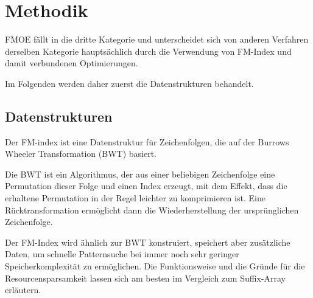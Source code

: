 \chapter{Methodik}
\label{ch:methodik}

FMOE fällt in die dritte Kategorie und unterscheidet sich von anderen Verfahren derselben Kategorie hauptsächlich durch die Verwendung von FM-Index und damit verbundenen Optimierungen.

Im Folgenden werden daher zuerst die Datenstrukturen behandelt.

\section{Datenstrukturen}
\label{sec:datenstrukturen}

Der FM-index ist eine Datenstruktur für Zeichenfolgen, die auf der Burrows Wheeler Transformation (BWT) basiert.

Die BWT ist ein Algorithmus, der aus einer beliebigen Zeichenfolge eine Permutation dieser Folge und einen Index erzeugt, mit dem Effekt, dass die erhaltene Permutation in der Regel leichter zu komprimieren ist.
Eine Rücktransformation ermöglicht dann die Wiederherstellung der ursprünglichen Zeichenfolge.

Der FM-Index wird ähnlich zur BWT konstruiert, speichert aber zusätzliche Daten, um schnelle Patternsuche bei immer noch sehr geringer Speicherkomplexität zu ermöglichen.
Die Funktionsweise und die Gründe für die Resourcensparsamkeit lassen sich am besten im Vergleich zum Suffix-Array erläutern.

